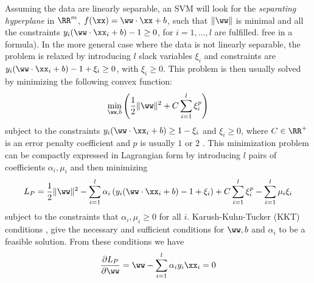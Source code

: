Assuming the
data are linearly separable, an SVM will look for the \emph{separating
hyperplane} in $\RR^m$, $f(\xx) = \ww\cdot\xx + b$, such that
$\|\ww\|$ is minimal and all the constraints
$y_i(\ww\cdot\xx_i + b)-1\geq 0$, for $i = 1,\ldots,l$ are fulfilled. 
free in a formula). 
In the more general case where the data is not
linearly separable, the problem is relaxed by introducing $l$ slack
variables $\xi_i$ and constraints are $y_i(\ww\cdot\xx_i +
b)-1+\xi_i\geq 0$, with $\xi_i \geq 0$.
This problem is then usually solved by minimizing the following convex
function:
\begin{equation} \label{eqn:svm_primal}
  \min_{\ww,b} \left( \frac{1}{2} \|\ww\|^2 + C \sum_{i=1}^l \xi_i^p \right)
\end{equation}
\noindent subject to the constraints $y_i (\ww\cdot\xx_i + b) \geq
1-\xi_i$ and $\xi_i \geq 0$, where $C \in \RR^+$ is an error penalty
coefficient and $p$ is usually $1$ or $2$ \cite{Cristianini00}. This
minimization problem can be compactly expressed in Lagrangian form by
introducing $l$ pairs of coefficients $\alpha_i, \mu_i$ and then
minimizing
\begin{equation} \label{eqn:lp1}
  L_P = \frac{1}{2} \|\ww\|^2 - \sum_{i=1}^l \alpha_i \left(y_i (\ww\cdot\xx_i+b) - 1 +
        \xi_i \right) + C \sum_{i=1}^l \xi_i^p - \sum_{i=1}^l \mu_i \xi_i \nonumber
\end{equation}
subject to the constraints that $\alpha_i,\mu_i\geq 0$ for all $i$.
Karush-Kuhn-Tucker (KKT) conditions \cite{Cristianini00},
give the necessary and sufficient conditions for $\ww, b$ and
$\alpha_i$ to be a feasible solution. From these conditions we have
\begin{equation}
  \frac{\partial L_P}{\partial \ww}= \ww - \sum_{i=1}^l \alpha_i y_i \xx_i = 0 \label{eqn:kkt1}
\end{equation}
